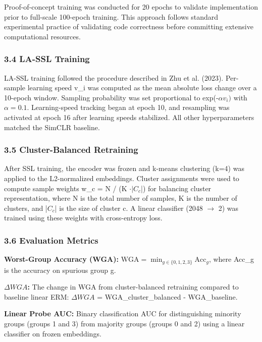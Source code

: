 Proof-of-concept training was conducted for 20 epochs to validate implementation prior to full-scale 100-epoch training. This approach follows standard experimental practice of validating code correctness before committing extensive computational resources.

\subsubsection{3.4 LA-SSL Training}

LA-SSL training followed the procedure described in Zhu et al. (2023). Per-sample learning speed v\_i was computed as the mean absolute loss change over a 10-epoch window. Sampling probability was set proportional to exp(-$\alpha v_{i})$ with $\alpha =0.1$. Learning-speed tracking began at epoch 10, and resampling was activated at epoch 16 after learning speeds stabilized. All other hyperparameters matched the SimCLR baseline.

\subsubsection{3.5 Cluster-Balanced Retraining}

After SSL training, the encoder was frozen and k-means clustering (k=4) was applied to the L2-normalized embeddings. Cluster assignments were used to compute sample weights w\_c = N / (K $\cdot |C_c$|) for balancing cluster representation, where N is the total number of samples, K is the number of clusters, and |$C_c$| is the size of cluster c. A linear classifier (2048 $\rightarrow$ 2) was trained using these weights with cross-entropy loss.

\subsubsection{3.6 Evaluation Metrics}

\textbf{Worst-Group Accuracy (WGA):} $\mathrm{WGA} = \min_{g\in \{0,1,2,3\}} \mathrm{Acc}_g$, where Acc\_g is the accuracy on spurious group g.

\textbf{$\Delta WGA$:} The change in WGA from cluster-balanced retraining compared to baseline linear ERM: $\Delta WGA$ = WGA\_cluster\_balanced - WGA\_baseline.

\textbf{Linear Probe AUC:} Binary classification AUC for distinguishing minority groups (groups 1 and 3) from majority groups (groups 0 and 2) using a linear classifier on frozen embeddings.

